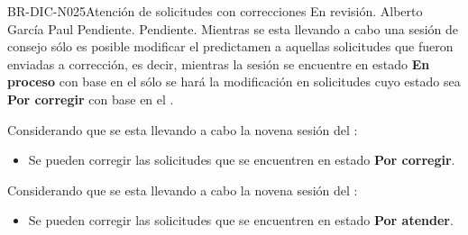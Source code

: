 \begin{BusinessRule}{BR-DIC-N025}{Atención de solicitudes con correcciones}
	{\bcCondition} %
	{\btEnabler}     %
	{\blControlling}     %
	\BRItem[Estado] En revisión.
	 Alberto García Paul	
	 Pendiente.
	 Pendiente.
	\BRItem[Descripción] Mientras se esta llevando a cabo una sesión de consejo sólo es posible modificar el predictamen a aquellas solicitudes que fueron enviadas a corrección, es decir, mientras la sesión se encuentre en estado \textbf{En proceso} con base en el  sólo se hará la modificación en solicitudes cuyo estado sea \textbf{Por corregir} con base en el .
	\BRItem[Sentencia] \cdtEmpty
	
	 Considerando que se esta llevando a cabo la novena sesión del :
	\begin{itemize}
		\item Se pueden corregir las solicitudes que se encuentren en estado \textbf{Por corregir}.
	\end{itemize} 
	
	 Considerando que se esta llevando a cabo la novena sesión del :
	\begin{itemize}
		\item Se pueden corregir las solicitudes que se encuentren en estado \textbf{Por atender}.
	\end{itemize}
	
\end{BusinessRule}

